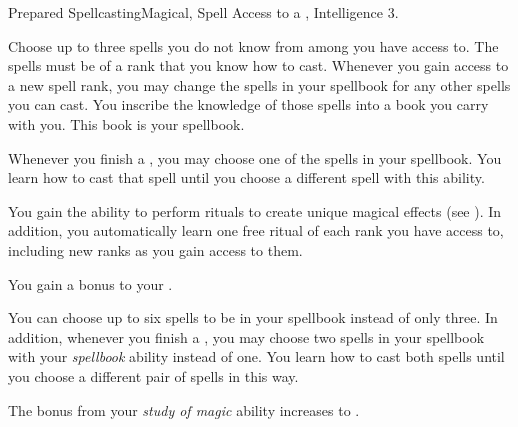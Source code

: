     \begin{magicalfeat}{Prepared Spellcasting}{Magical, Spell}
        \featpre Access to a , Intelligence 3.

         Choose up to three spells you do not know from among  you have access to.
        The spells must be of a rank that you know how to cast.
        Whenever you gain access to a new spell rank, you may change the spells in your spellbook for any other spells you can cast.
        You inscribe the knowledge of those spells into a book you carry with you.
        This book is your spellbook.
        
        Whenever you finish a , you may choose one of the spells in your spellbook.
        You learn how to cast that spell until you choose a different spell with this ability.

         You gain the ability to perform rituals to create unique magical effects (see ).
        In addition, you automatically learn one free ritual of each rank you have access to, including new ranks as you gain access to them.

         You gain a  bonus to your .

         You can choose up to six spells to be in your spellbook instead of only three.
        In addition, whenever you finish a , you may choose two spells in your spellbook with your \textit{spellbook} ability instead of one.
        You learn how to cast both spells until you choose a different pair of spells in this way.

         The bonus from your \textit{study of magic} ability increases to .
    \end{magicalfeat}

